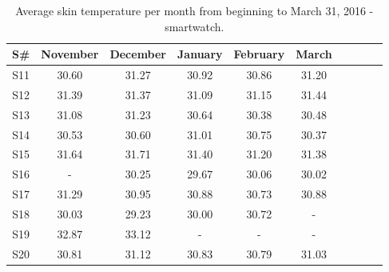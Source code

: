\documentclass[12pt]{article} %
\begin{document}
\newpage
\begin{table}[H]
\center
\begin{footnotesize}
	\begin{tabular}{| c | c | c | c | c | c | c | c | c | c |}
	\hline
	\textbf{S\#} & \textbf{November} & \textbf{December} & \textbf{January} & \textbf{February} & \textbf{March} \\
	
	\hline
	S11 & 30.60 & 31.27 & 30.92 & 30.86 & 31.20\\
	\hline
	S12 & 31.39 & 31.37 & 31.09 & 31.15 & 31.44\\
	\hline
	S13 & 31.08 & 31.23 & 30.64 & 30.38 & 30.48\\
	\hline
	S14 & 30.53 & 30.60 & 31.01 & 30.75 & 30.37\\
	\hline
	S15 & 31.64 & 31.71 & 31.40 & 31.20 & 31.38\\
	\hline
	S16 & - & 30.25 & 29.67 & 30.06 & 30.02\\
	\hline
	S17 & 31.29 & 30.95 & 30.88 & 30.73 & 30.88\\
	\hline
	S18 & 30.03 & 29.23 & 30.00 & 30.72 & - \\
	\hline
	S19 & 32.87 & 33.12 & - & - & -\\
	\hline
	S20 & 30.81 & 31.12 & 30.83 & 30.79 & 31.03\\
	\hline
	\end{tabular}
	\caption{Average skin temperature per month from beginning to March 31, 2016 - smartwatch.}
	\label{tab:skinMinutesWatch}
\end{footnotesize}
\end{table}
\end{document}
